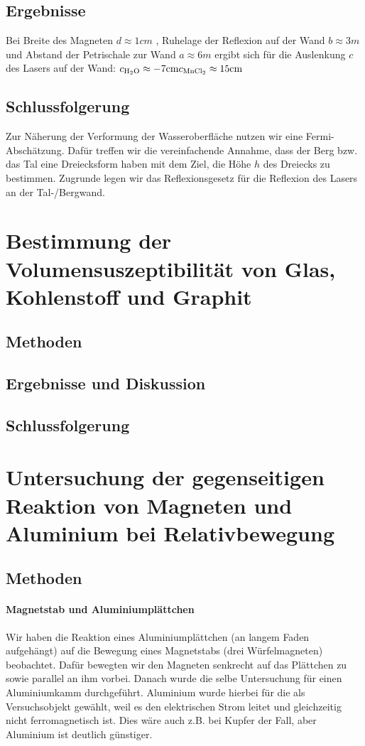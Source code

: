 \documentclass[
	a4paper,
	12pt,
	pagesize,
	ngerman
]{scrartcl}
\begin{document}
	\subsection{Ergebnisse}
	Bei Breite des Magneten $d \approx 1 \si{cm}$ , Ruhelage der Reflexion auf der Wand $b \approx 3 \si{m}$ und Abstand der Petrischale zur Wand $a \approx 6 \si{m}$ ergibt sich für die Auslenkung $c$ des Lasers auf der Wand: \newline
	$ c_\text{\ce{H2O}} \approx -7 \si{cm} \\
	c_\text{\ce{MnCl2}} \approx 15 \si{cm}$
	
	\subsection{Schlussfolgerung}
	Zur Näherung der Verformung der Wasseroberfläche nutzen wir eine Fermi-Abschätzung. Dafür treffen wir die vereinfachende Annahme, dass der Berg bzw. das Tal eine Dreiecksform haben mit dem Ziel, die Höhe $h$ des Dreiecks zu bestimmen. Zugrunde legen wir das Reflexionsgesetz für die Reflexion des Lasers an der Tal-/Bergwand.
	
	\section{Bestimmung der Volumensuszeptibilität von Glas, Kohlenstoff und Graphit}
	\subsection{Methoden}
	\subsection{Ergebnisse und Diskussion}
	\subsection{Schlussfolgerung}
	
	\section{Untersuchung der gegenseitigen Reaktion von Magneten und Aluminium bei Relativbewegung}
	\subsection{Methoden}
	\paragraph{Magnetstab und Aluminiumplättchen}
	Wir haben die Reaktion eines Aluminiumplättchen (an langem Faden aufgehängt) auf die Bewegung eines Magnetstabs (drei Würfelmagneten) beobachtet. Dafür bewegten wir den Magneten senkrecht auf das Plättchen zu sowie parallel an ihm vorbei.
	Danach wurde die selbe Untersuchung für einen Aluminiumkamm durchgeführt. Aluminium wurde hierbei für die als Versuchsobjekt gewählt, weil es den elektrischen Strom leitet und gleichzeitig nicht ferromagnetisch ist. Dies wäre auch z.B. bei Kupfer der Fall, aber Aluminium ist deutlich günstiger. %
\end{document}
